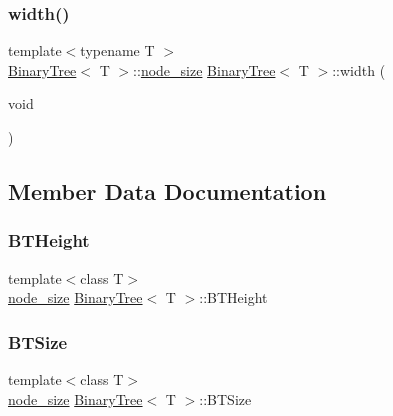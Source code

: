 \mbox{\label{class_binary_tree_ac1ac7f0c60b0ada90f726ed4b5b391cd}} 
\subsubsection{\texorpdfstring{width()}{width()}}
{\footnotesize\ttfamily template$<$typename T $>$ \\
\hyperlink{class_binary_tree}{Binary\+Tree}$<$ T $>$\+::\hyperlink{class_binary_tree_a6c9d1d57bf13ca658fe926a0c7255ecf}{node\+\_\+size} \hyperlink{class_binary_tree}{Binary\+Tree}$<$ T $>$\+::width (\begin{DoxyParamCaption}\item[{void}]{ }\end{DoxyParamCaption})}



\subsection{Member Data Documentation}
\mbox{\label{class_binary_tree_a2917f2e27810e6ddbb91ab01d0121a78}} 
\subsubsection{\texorpdfstring{B\+T\+Height}{BTHeight}}
{\footnotesize\ttfamily template$<$class T$>$ \\
\hyperlink{class_binary_tree_a6c9d1d57bf13ca658fe926a0c7255ecf}{node\+\_\+size} \hyperlink{class_binary_tree}{Binary\+Tree}$<$ T $>$\+::B\+T\+Height\hspace{0.3cm}{\ttfamily [protected]}}

\mbox{\label{class_binary_tree_ab81143527ccb89d1d804477ab04dce4e}} 
\subsubsection{\texorpdfstring{B\+T\+Size}{BTSize}}
{\footnotesize\ttfamily template$<$class T$>$ \\
\hyperlink{class_binary_tree_a6c9d1d57bf13ca658fe926a0c7255ecf}{node\+\_\+size} \hyperlink{class_binary_tree}{Binary\+Tree}$<$ T $>$\+::B\+T\+Size\hspace{0.3cm}{\ttfamily [protected]}}

